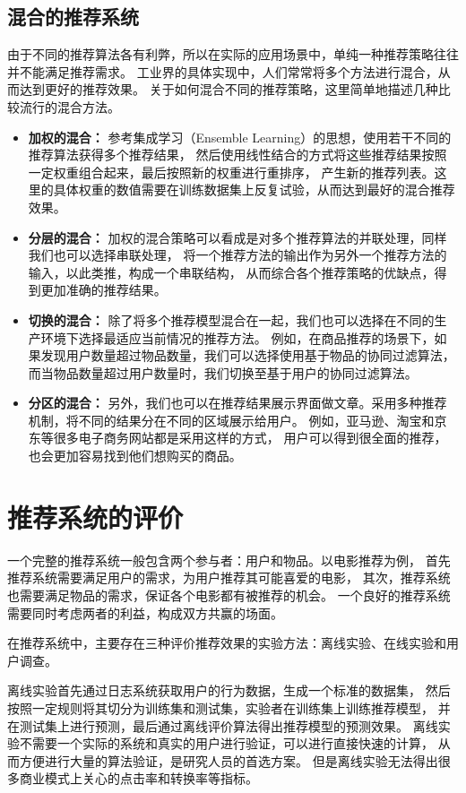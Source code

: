 \subsection{混合的推荐系统}
由于不同的推荐算法各有利弊，所以在实际的应用场景中，单纯一种推荐策略往往并不能满足推荐需求。
工业界的具体实现中，人们常常将多个方法进行混合，从而达到更好的推荐效果。
关于如何混合不同的推荐策略，这里简单地描述几种比较流行的混合方法。
\begin{itemize}
\item \textbf{加权的混合：}
参考集成学习（Ensemble Learning）的思想，使用若干不同的推荐算法获得多个推荐结果，
然后使用线性结合的方式将这些推荐结果按照一定权重组合起来，最后按照新的权重进行重排序，
产生新的推荐列表。这里的具体权重的数值需要在训练数据集上反复试验，从而达到最好的混合推荐效果。
\item \textbf{分层的混合：}
加权的混合策略可以看成是对多个推荐算法的并联处理，同样我们也可以选择串联处理，
将一个推荐方法的输出作为另外一个推荐方法的输入，以此类推，构成一个串联结构，
从而综合各个推荐策略的优缺点，得到更加准确的推荐结果。
\item \textbf{切换的混合：}
除了将多个推荐模型混合在一起，我们也可以选择在不同的生产环境下选择最适应当前情况的推荐方法。
例如，在商品推荐的场景下，如果发现用户数量超过物品数量，我们可以选择使用基于物品的协同过滤算法，
而当物品数量超过用户数量时，我们切换至基于用户的协同过滤算法。
\item \textbf{分区的混合：}
另外，我们也可以在推荐结果展示界面做文章。采用多种推荐机制，将不同的结果分在不同的区域展示给用户。
例如，亚马逊、淘宝和京东等很多电子商务网站都是采用这样的方式，
用户可以得到很全面的推荐，也会更加容易找到他们想购买的商品。
\end{itemize}

\section{推荐系统的评价}
一个完整的推荐系统一般包含两个参与者：用户和物品。以电影推荐为例，
首先推荐系统需要满足用户的需求，为用户推荐其可能喜爱的电影，
其次，推荐系统也需要满足物品的需求，保证各个电影都有被推荐的机会。
一个良好的推荐系统需要同时考虑两者的利益，构成双方共赢的场面。

在推荐系统中，主要存在三种评价推荐效果的实验方法：离线实验、在线实验和用户调查。

离线实验首先通过日志系统获取用户的行为数据，生成一个标准的数据集，
然后按照一定规则将其切分为训练集和测试集，实验者在训练集上训练推荐模型，
并在测试集上进行预测，最后通过离线评价算法得出推荐模型的预测效果。
离线实验不需要一个实际的系统和真实的用户进行验证，可以进行直接快速的计算，
从而方便进行大量的算法验证，是研究人员的首选方案。
但是离线实验无法得出很多商业模式上关心的点击率和转换率等指标。

